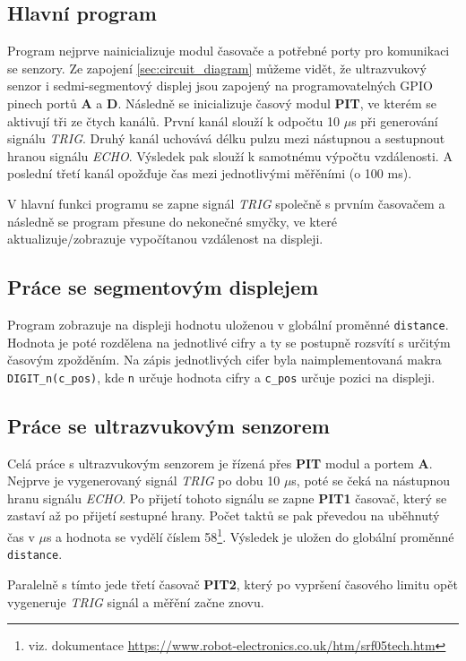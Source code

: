 \documentclass[a4paper,11pt]{article}
\begin{document}
    \subsection{Hlavní program}
    Program nejprve nainicializuje modul časovače a potřebné porty pro komunikaci se senzory. Ze zapojení \ref{sec:circuit_diagram} můžeme vidět,
    že ultrazvukový senzor i sedmi-segmentový displej jsou zapojený na programovatelných GPIO pinech portů \textbf{A} a \textbf{D}.
    Následně se inicializuje časový modul \textbf{PIT}, ve kterém se aktivují tři ze čtych kanálů. První kanál slouží k odpočtu 10 $\mu$s
    při generování signálu \emph{TRIG}. Druhý kanál uchovává délku pulzu mezi nástupnou a sestupnout hranou signálu \emph{ECHO}. Výsledek pak slouží
    k samotnému výpočtu vzdálenosti. A poslední třetí kanál opožďuje čas mezi jednotlivými měřěními (o 100 ms).

    V hlavní funkci programu se zapne signál \emph{TRIG} společně s prvním časovačem a následně se program přesune do
    nekonečné smyčky, ve které aktualizuje/zobrazuje vypočítanou vzdálenost na displeji.

    \subsection{Práce se segmentovým displejem}
    Program zobrazuje na displeji hodnotu uloženou v globální proměnné \verb|distance|. Hodnota je poté rozdělena na jednotlivé cifry a ty
    se postupně rozsvítí s určitým časovým zpožděním. Na zápis jednotlivých cifer byla naimplementovaná makra \verb|DIGIT_n(c_pos)|, kde \verb|n|
    určuje hodnota cifry a \verb|c_pos| určuje pozici na displeji.

    \subsection{Práce se ultrazvukovým senzorem}
    Celá práce s ultrazvukovým senzorem je řízená přes \textbf{PIT} modul a portem \textbf{A}. Nejprve je vygenerovaný signál \emph{TRIG} po dobu 10 $\mu$s,
    poté se čeká na nástupnou hranu signálu \emph{ECHO}. Po přijetí tohoto signálu se zapne \textbf{PIT1} časovač, který se zastaví až po přijetí
    sestupné hrany. Počet taktů se pak převedou na uběhnutý čas v $\mu$s a hodnota se vydělí číslem 58\footnote{viz. dokumentace \url{https://www.robot-electronics.co.uk/htm/srf05tech.htm}}.
    Výsledek je uložen do globální proměnné \verb|distance|.

    Paralelně s tímto jede třetí časovač \textbf{PIT2}, který po vypršení časového limitu opět vygeneruje \emph{TRIG} signál a měřění začne znovu.
\end{document}
